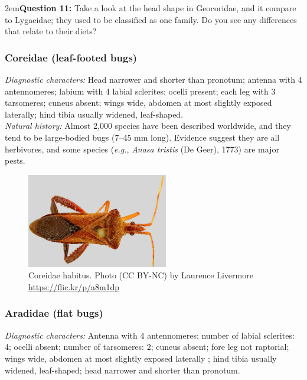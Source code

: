 \documentclass[letterpaper, 11pt]{article}
\begin{document}
\hangindent2em\textbf{Question 11:} Take a look at the head shape in Geocoridae, and it compare to Lygaeidae; they used to be classified as one family. Do you see any differences that relate to their diets?\\

\subsubsection{Coreidae (leaf-footed bugs)}
\noindent{}\textit{Diagnostic characters:} Head narrower and shorter than pronotum; antenna with 4 antennomeres; labium with 4 labial sclerites; ocelli present; each leg with 3 tarsomeres; cuneus absent; wings wide, abdomen at most slightly exposed laterally; hind tibia usually widened, leaf-shaped.\\

\noindent{}\textit{Natural history:} Almost 2,000 species have been described worldwide, and they tend to be large-bodied bugs (7--45 mm long). Evidence suggest they are all herbivores, and some species (\textit{e.g.}, \textit{Anasa tristis} (De Geer), 1773) are major pests.\\

\begin{figure}[ht!]
 \centering
 \includegraphics[width=0.55\textwidth]{CoreidHabitus}
 \caption{Coreidae habitus. Photo (CC BY-NC) by Laurence Livermore \url{https://flic.kr/p/a8m1dp}}
 \label{fig:coreid1}
\end{figure}

\subsubsection{Aradidae (flat bugs)}
\noindent{}\textit{Diagnostic characters:} Antenna with 4 antennomeres; number of labial sclerites: 4; ocelli absent; number of tarsomeres: 2; cuneus absent; fore leg not raptorial; wings wide, abdomen at most slightly exposed laterally ; hind tibia usually widened, leaf-shaped; head narrower and shorter than pronotum.\\
\end{document}
